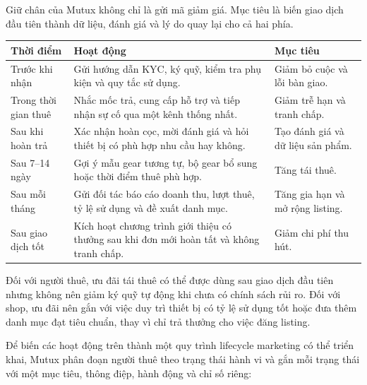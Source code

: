 Giữ chân của Mutux không chỉ là gửi mã giảm giá. Mục tiêu là biến giao dịch đầu tiên thành dữ liệu, đánh giá và lý do quay lại cho cả hai phía.

\begin{longtable}{@{}p{}p{}p{}@{}}
\toprule
\textbf{Thời điểm} & \textbf{Hoạt động} & \textbf{Mục tiêu} \\
\midrule
\endhead
Trước khi nhận & Gửi hướng dẫn KYC, ký quỹ, kiểm tra phụ kiện và quy tắc sử dụng. & Giảm bỏ cuộc và lỗi bàn giao. \\
Trong thời gian thuê & Nhắc mốc trả, cung cấp hỗ trợ và tiếp nhận sự cố qua một kênh thống nhất. & Giảm trễ hạn và tranh chấp. \\
Sau khi hoàn trả & Xác nhận hoàn cọc, mời đánh giá và hỏi thiết bị có phù hợp nhu cầu hay không. & Tạo đánh giá và dữ liệu sản phẩm. \\
Sau 7--14 ngày & Gợi ý mẫu gear tương tự, bộ gear bổ sung hoặc thời điểm thuê phù hợp. & Tăng tái thuê. \\
Sau mỗi tháng & Gửi đối tác báo cáo doanh thu, lượt thuê, tỷ lệ sử dụng và đề xuất danh mục. & Tăng gia hạn và mở rộng listing. \\
Sau giao dịch tốt & Kích hoạt chương trình giới thiệu có thưởng sau khi đơn mới hoàn tất và không tranh chấp. & Giảm chi phí thu hút. \\
\bottomrule
\end{longtable}

Đối với người thuê, ưu đãi tái thuê có thể được dùng sau giao dịch đầu tiên nhưng không nên giảm ký quỹ tự động khi chưa có chính sách rủi ro. Đối với shop, ưu đãi nên gắn với việc duy trì thiết bị có tỷ lệ sử dụng tốt hoặc đưa thêm danh mục đạt tiêu chuẩn, thay vì chỉ trả thưởng cho việc đăng listing.

Để biến các hoạt động trên thành một quy trình lifecycle marketing có thể triển khai, Mutux phân đoạn người thuê theo trạng thái hành vi và gắn mỗi trạng thái với một mục tiêu, thông điệp, hành động và chỉ số riêng:

